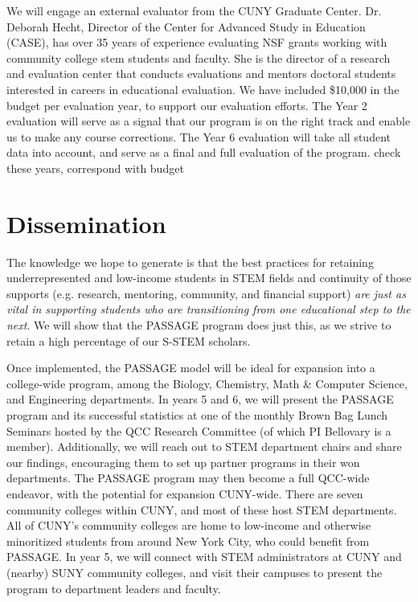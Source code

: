 \documentclass[12pt]{article}
\newcommand\new[1]{{\color{blue}#1}}
\begin{document}
We will engage an external evaluator from the CUNY Graduate Center.  \new{Dr. Deborah Hecht, Director of the Center for Advanced Study in Education (CASE), has over 35 years of experience evaluating NSF grants working with community college stem students and faculty.  She is the director of a research and evaluation center that conducts evaluations and mentors doctoral students interested in careers in educational evaluation.}   We have included \$10,000 in the budget per evaluation year, to support our evaluation efforts.  The Year 2 evaluation will serve as a signal that our program is on the right track and enable us to make any course corrections.  The Year 6 evaluation will take all student data into account, and serve as a final and full evaluation of the program. \new{check these years, correspond with budget}
\vspace{-5mm}

\section{\large{Dissemination}}
\vspace{-3mm}

The knowledge we hope to generate is that the best practices for retaining underrepresented and low-income students in STEM fields and continuity of those supports (e.g. research, mentoring, community, and financial support) {\em are just as vital in supporting students who are transitioning from one educational step to the next}.  We will show that the PASSAGE program does just this, as we strive to retain a high percentage of our S-STEM scholars.

Once implemented, the PASSAGE model will be ideal for expansion into a college-wide program, among the Biology, Chemistry, Math \& Computer Science, and Engineering departments.  In years 5 and 6, we will present the PASSAGE program and its successful statistics at one of the monthly Brown Bag Lunch Seminars hosted by the QCC Research Committee (of which PI Bellovary is a member).  Additionally, we will reach out to STEM department chairs and share our findings, encouraging them to set up partner programs in their won departments.   The PASSAGE program may then become a full QCC-wide endeavor, with the potential for expansion CUNY-wide.  There are seven community colleges within CUNY, and most of these host STEM departments.   All of CUNY's community colleges are home to low-income and otherwise minoritized students from around New York City, who could benefit from PASSAGE.  In year 5, we will connect with STEM administrators at CUNY and (nearby) SUNY community colleges, and visit their campuses to present the program to department leaders and faculty.
\end{document}
